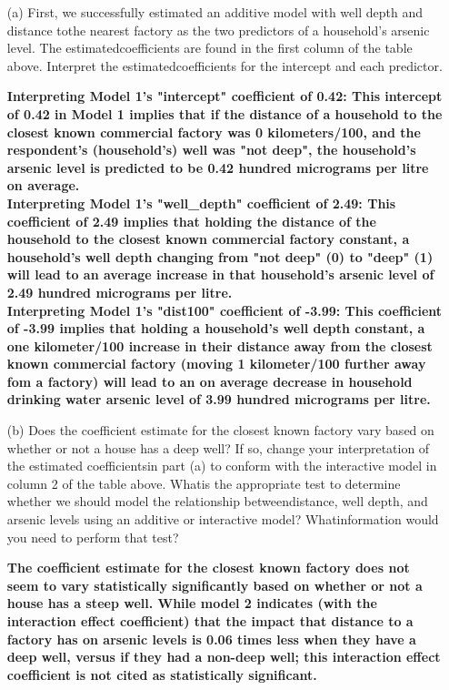\documentclass[12pt,letterpaper]{article}
\begin{document}
\begin{enumerate}
	\item [(a)] First, we successfully estimated an additive model with well depth and distance tothe nearest factory as the two predictors of a household’s arsenic level. The estimatedcoefficients are found in the first column of the table above. Interpret the estimatedcoefficients for the intercept and each predictor.
	
	\textbf{Interpreting Model 1's "intercept" coefficient of 0.42: This intercept of 0.42 in Model 1 implies that if the distance of a household to the closest known commercial factory was 0 kilometers/100, and the respondent's (household's) well was "not deep", the household's arsenic level is predicted to be 0.42 hundred micrograms per litre on average.}
	\\
	
	\textbf{Interpreting Model 1's "well\_depth" coefficient of 2.49: This coefficient of 2.49 implies that holding the distance of the household to the closest known commercial factory constant, a household's well depth changing from "not deep" (0) to "deep" (1) will lead to an average increase in that household's arsenic level of 2.49 hundred micrograms per litre.}
	\\
	
	\textbf{Interpreting Model 1's "dist100" coefficient of -3.99: This coefficient of -3.99 implies that holding a household's well depth constant, a one kilometer/100 increase in their distance away from the closest known commercial factory (moving 1 kilometer/100 further away fom a factory) will lead to an on average decrease in household drinking water arsenic level of 3.99 hundred micrograms per litre. }
	
			
	\item [(b)] Does the coefficient estimate for the closest known factory vary based on whether or not a house has a deep well? If so, change your interpretation of the estimated coefficientsin part (a) to conform with the interactive model in column 2 of the table above. Whatis the appropriate test to determine whether we should model the relationship betweendistance, well depth, and arsenic levels using an additive or interactive model? Whatinformation would you need to perform that test?
	
	\textbf{The coefficient estimate for the closest known factory does not seem to vary statistically significantly based on whether or not a house has a steep well. While model 2 indicates (with the interaction effect coefficient) that the impact that distance to a factory has on arsenic levels is 0.06 times less when they have a deep well, versus if they had a non-deep well; this interaction effect coefficient is not cited as statistically significant.}
		

\end{enumerate}
\end{document}
